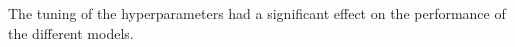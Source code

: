 


The tuning of the hyperparameters had a significant effect on the performance of the different models.

